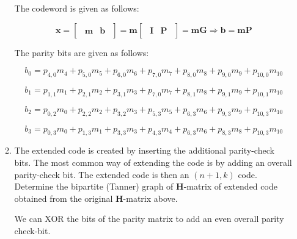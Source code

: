 \documentclass[fleqn]{article}
\begin{document}
\begin{enumerate}
\begin{enumerate}
			The codeword is given as follows:
			
			\begin{equation*}
				\mathbf{x} = \begin{bmatrix}{\begin{array}{c|c}
					\mathbf{m} & \mathbf{b}			
				\end{array}}\end{bmatrix} = \mathbf{m}\begin{bmatrix}
					\begin{array}{c|c}
						\mathbf{I} & \mathbf{P}
					\end{array}
				\end{bmatrix} = \mathbf{mG} 
				\Rightarrow \mathbf{b} = \mathbf{mP}
			\end{equation*}
			
			The parity bits are given as follows:
			
			\begin{equation*}
				b_0 = p_{4,0}m_{4} + p_{5,0}m_{5} + p_{6,0}m_{6} + p_{7,0}m_{7} + p_{8,0}m_{8} + p_{9,0}m_{9} + p_{10,0}m_{10}
			\end{equation*}
			
			\begin{equation*}
				b_1 = p_{1,1}m_{1} + p_{2,1}m_{2} + p_{3,1}m_{3} + p_{7,0}m_{7} + p_{8,1}m_{8} + p_{9,1}m_{9} + p_{10,1}m_{10}
			\end{equation*}
			
			\begin{equation*}
				b_2 = p_{0,2}m_{0} + p_{2,2}m_{2} + p_{3,2}m_{3} + p_{5,3}m_{5} + p_{6,3}m_{6} + p_{9,3}m_{9} + p_{10,3}m_{10}
			\end{equation*}
			
			\begin{equation*}
				b_3 = p_{0,3}m_{0} + p_{1,3}m_{1} + p_{3,3}m_{3} + p_{4,3}m_{4} + p_{6,3}m_{6} + p_{8,3}m_{8} + p_{10,3}m_{10}
			\end{equation*}
			
			\item The extended code is created by inserting the additional parity-check bits. The most common way of extending the code is by adding an overall parity-check bit. The extended code is then an $(n+1,k)$ code. Determine the bipartite (Tanner) graph of $\mathbf{H}$-matrix of extended code obtained from the original $\mathbf{H}$-matrix above.
			
			We can XOR the bits of the parity matrix to add an even overall parity check-bit.
			

\end{enumerate}
\end{enumerate}
\end{document}
